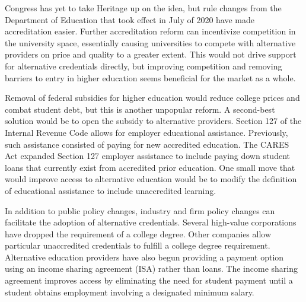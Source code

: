 \documentclass[review]{elsarticle}
\begin{document}
Congress has yet to take Heritage up on the idea,
but rule changes from the Department of Education that took effect in July of 2020
have made accreditation easier\cite{weissman_2019}.
Further accreditation reform can incentivize competition in the university space,
essentially causing universities to compete with alternative providers on price and quality to a greater extent.
This would not drive support for alternative credentials directly,
but improving competition and removing barriers to entry in higher education seems beneficial for the market as a whole.


Removal of federal subsidies for higher education would reduce college prices and combat student debt,
but this is another unpopular reform.
A second-best solution would be to open the subsidy to alternative providers.
Section 127 of the Internal Revenue Code allows for employer educational assistance.
Previously, such assistance consisted of paying for new accredited education.
The CARES Act expanded Section 127 employer assistance
to include paying down student loans that currently exist from accredited prior education\cite{miller_2021}.
One small move that would improve access to alternative education
would be to modify the definition of educational assistance to include unaccredited learning.

In addition to public policy changes, industry and firm policy changes can facilitate the adoption of alternative credentials.
Several high-value corporations have dropped the requirement of a college degree\cite{team_2020}.
Other companies allow particular unaccredited credentials to fulfill a college degree requirement.
Alternative education providers have also begun providing a payment option using an income sharing agreement (ISA) rather than loans.
The income sharing agreement improves access by eliminating the need for student payment
until a student obtains employment involving a designated minimum salary.



\end{document}
